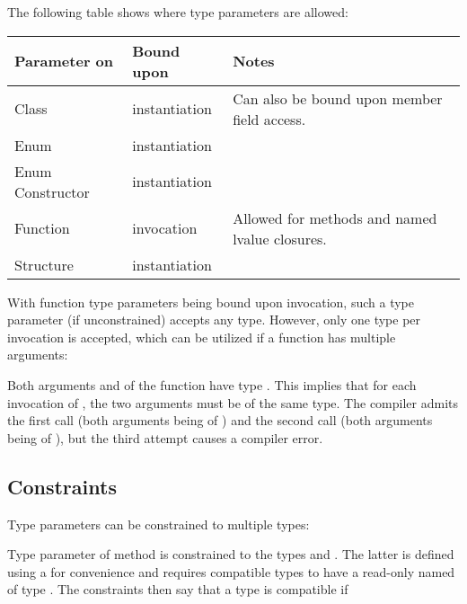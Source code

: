\documentclass{haxe}
\begin{document}
The following table shows where type parameters are allowed:

\begin{center}
\begin{tabular}{| l | l | l |}
	\hline
	Parameter on & Bound upon & Notes \\ \hline
	Class & instantiation & Can also be bound upon member field access. \\
	Enum & instantiation & \\
	Enum Constructor & instantiation & \\
	Function & invocation & Allowed for methods and named lvalue closures. \\
	Structure & instantiation & \\ \hline
\end{tabular}
\end{center}
With function type parameters being bound upon invocation, such a type parameter (if unconstrained) accepts any type. However, only one type per invocation is accepted, which can be utilized if a function has multiple arguments:


Both arguments  and  of the  function have type . This implies that for each invocation of , the two arguments must be of the same type. The compiler admits the first call (both arguments being of ) and the second call (both arguments being of ), but the third attempt causes a compiler error.


\subsection{Constraints}
\label{type-system-type-parameter-constraints}

Type parameters can be constrained to multiple types:

Type parameter  of method  is constrained to the types  and . The latter is defined using a  for convenience and requires compatible types to have a read-only  named  of type . The constraints then say that a type is compatible if
\end{document}
